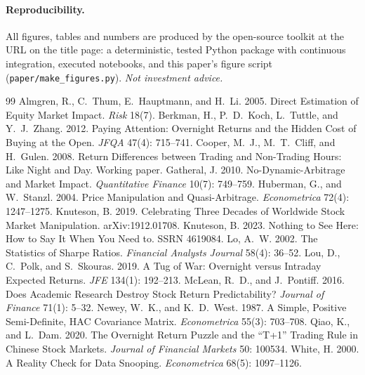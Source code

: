 \documentclass[11pt]{article}
\begin{document}
\paragraph{Reproducibility.} All figures, tables and numbers are produced by the
open-source toolkit at the URL on the title page: a deterministic, tested
Python package with continuous integration, executed notebooks, and this paper's
figure script (\texttt{paper/make\_figures.py}). \emph{Not investment advice.}

\begin{thebibliography}{99}
\small
{} Almgren, R., C.\ Thum, E.\ Hauptmann, and H.\ Li. 2005. Direct Estimation of Equity Market Impact. \emph{Risk} 18(7).
 Berkman, H., P.\ D.\ Koch, L.\ Tuttle, and Y.\ J.\ Zhang. 2012. Paying Attention: Overnight Returns and the Hidden Cost of Buying at the Open. \emph{JFQA} 47(4): 715--741.
 Cooper, M.\ J., M.\ T.\ Cliff, and H.\ Gulen. 2008. Return Differences between Trading and Non-Trading Hours: Like Night and Day. Working paper.
 Gatheral, J. 2010. No-Dynamic-Arbitrage and Market Impact. \emph{Quantitative Finance} 10(7): 749--759.
 Huberman, G., and W.\ Stanzl. 2004. Price Manipulation and Quasi-Arbitrage. \emph{Econometrica} 72(4): 1247--1275.
 Knuteson, B. 2019. Celebrating Three Decades of Worldwide Stock Market Manipulation. arXiv:1912.01708.
 Knuteson, B. 2023. Nothing to See Here: How to Say It When You Need to. SSRN 4619084.
 Lo, A.\ W. 2002. The Statistics of Sharpe Ratios. \emph{Financial Analysts Journal} 58(4): 36--52.
 Lou, D., C.\ Polk, and S.\ Skouras. 2019. A Tug of War: Overnight versus Intraday Expected Returns. \emph{JFE} 134(1): 192--213.
 McLean, R.\ D., and J.\ Pontiff. 2016. Does Academic Research Destroy Stock Return Predictability? \emph{Journal of Finance} 71(1): 5--32.
 Newey, W.\ K., and K.\ D.\ West. 1987. A Simple, Positive Semi-Definite, HAC Covariance Matrix. \emph{Econometrica} 55(3): 703--708.
 Qiao, K., and L.\ Dam. 2020. The Overnight Return Puzzle and the ``T+1'' Trading Rule in Chinese Stock Markets. \emph{Journal of Financial Markets} 50: 100534.
 White, H. 2000. A Reality Check for Data Snooping. \emph{Econometrica} 68(5): 1097--1126.
\end{thebibliography}
\end{document}
